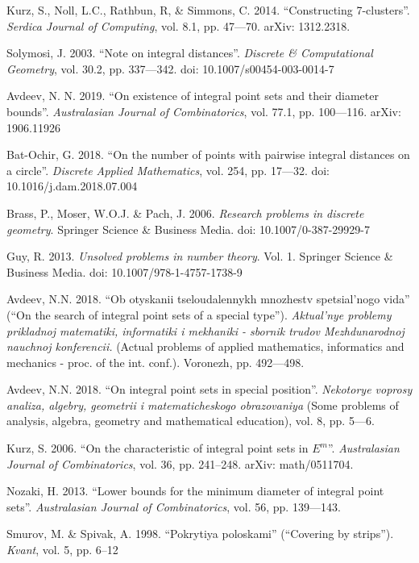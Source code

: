 \begin{engbibliography}{99}
	Kurz, S., Noll, L.C., Rathbun, R, \& Simmons, C. 2014.
	“Constructing 7-clusters”.
	\emph{Serdica Journal of Computing}, vol. 8.1, pp. 47—70. arXiv: 1312.2318.

	Solymosi, J. 2003.
	“Note on integral distances”.
	\emph{Discrete \& Computational Geometry}, vol. 30.2, pp. 337—342.
	doi: 10.1007/s00454-003-0014-7

	Avdeev, N. N. 2019.
	“On existence of integral point sets and their diameter bounds”.
	\emph{Australasian Journal of Combinatorics}, vol. 77.1, pp. 100—116.
	arXiv: 1906.11926

	Bat-Ochir, G. 2018.
	“On the number of points with pairwise integral distances on a circle”.
	\emph{Discrete Applied Mathematics}, vol. 254, pp. 17—32.
	doi: 10.1016/j.dam.2018.07.004

	Brass, P., Moser, W.O.J. \& Pach, J. 2006.
	\emph{Research problems in discrete geometry}. Springer Science \& Business Media.
	doi: 10.1007/0-387-29929-7

	Guy, R. 2013.
	\emph{Unsolved problems in number theory}. Vol. 1.
	Springer Science \& Business Media.
	doi: 10.1007/978-1-4757-1738-9

	Avdeev, N.N. 2018.
	“Ob otyskanii tseloudalennykh mnozhestv spetsial'nogo vida”
	(``On the search of integral point sets of a special type'').
	\emph{
		Aktual'nye problemy prikladnoj matematiki, informatiki i mekhaniki
		- sbornik trudov Mezhdunarodnoj nauchnoj konferencii.
	}
	(Actual problems of applied mathematics, informatics and mechanics
	- proc. of the int. conf.).
	Voronezh, pp. 492—498.

	Avdeev, N.N. 2018.
	“On integral point sets in special position”.
	\emph{Nekotorye voprosy analiza, algebry, geometrii i matematicheskogo obrazovaniya}
	(Some problems of analysis, algebra, geometry and mathematical education), vol. 8, pp. 5—6.

	Kurz, S. 2006.
	“On the characteristic of integral point sets in $E^m$”.
	\emph{Australasian Journal of Combinatorics}, vol. 36, pp. 241–248.
	arXiv: math/0511704.

	Nozaki, H. 2013.
	“Lower bounds for the minimum diameter of integral point sets”.
	\emph{Australasian Journal of Combinatorics}, vol. 56, pp. 139—143.

	Smurov, M. \& Spivak, A. 1998.
	“Pokrytiya poloskami” (``Covering by strips'').
	\emph{Kvant}, vol. 5, pp. 6--12

\end{engbibliography}

